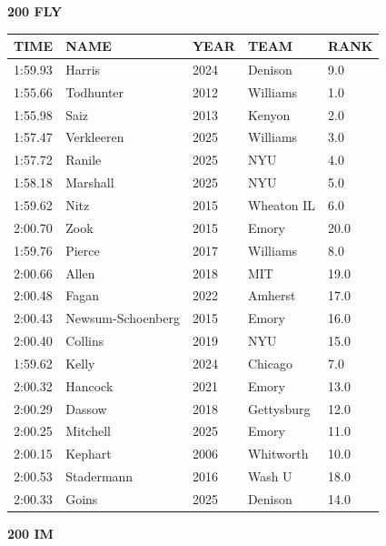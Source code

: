 \begin{table}[H]
\centering
\begin{minipage}[t]{0.48\textwidth}
\centering
\textbf{200 FLY}\\[0.1cm]
\begin{tabular}{@{}p{1.8cm}p{2.8cm}p{1.2cm}p{1.4cm}p{0.8cm}@{}}
\hline
    \textbf{TIME} & \textbf{NAME} & \textbf{YEAR} & \textbf{TEAM} & \textbf{RANK} \\
\hline
    1:59.93 & Harris & 2024 & Denison & 9.0 \\
    1:55.66 & Todhunter & 2012 & Williams & 1.0 \\
    1:55.98 & Saiz & 2013 & Kenyon & 2.0 \\
    1:57.47 & Verkleeren & 2025 & Williams & 3.0 \\
    1:57.72 & Ranile & 2025 & NYU & 4.0 \\
    1:58.18 & Marshall & 2025 & NYU & 5.0 \\
    1:59.62 & Nitz & 2015 & Wheaton IL & 6.0 \\
    2:00.70 & Zook & 2015 & Emory & 20.0 \\
    1:59.76 & Pierce & 2017 & Williams & 8.0 \\
    2:00.66 & Allen & 2018 & MIT & 19.0 \\
    2:00.48 & Fagan & 2022 & Amherst & 17.0 \\
    2:00.43 & Newsum-Schoenberg & 2015 & Emory & 16.0 \\
    2:00.40 & Collins & 2019 & NYU & 15.0 \\
    1:59.62 & Kelly & 2024 & Chicago & 7.0 \\
    2:00.32 & Hancock & 2021 & Emory & 13.0 \\
    2:00.29 & Dassow & 2018 & Gettysburg & 12.0 \\
    2:00.25 & Mitchell & 2025 & Emory & 11.0 \\
    2:00.15 & Kephart & 2006 & Whitworth & 10.0 \\
    2:00.53 & Stadermann & 2016 & Wash U & 18.0 \\
    2:00.33 & Goins & 2025 & Denison & 14.0 \\
\hline
\end{tabular}
\end{minipage}\hfill
\begin{minipage}[t]{0.48\textwidth}
\centering
\textbf{200 IM}\\[0.1cm]
\begin{tabular}{@{}p{1.8cm}p{2.8cm}p{1.2cm}p{1.4cm}p{0.8cm}@{}}

\end{tabular}
\end{minipage}
\end{table}
